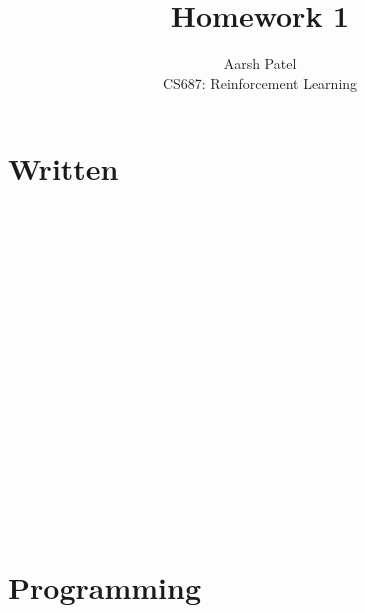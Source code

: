 \documentclass[12pt]{article}
\newenvironment{problem}[2][Problem]{\begin{trivlist}
\item[\hskip \labelsep {\bfseries #1}\hskip \labelsep {\bfseries #2.}]}{\end{trivlist}}
\begin{document}
\title{Homework 1}
\author{Aarsh Patel\\
CS687: Reinforcement Learning}

\maketitle

\section{Written}

\begin{problem}{1}
\text{ }\\
\end{problem}

\begin{problem}{2}
\text{ }\\
\end{problem}

\begin{problem}{3}
\text{ }\\
\end{problem}

\begin{problem}{4}
\text{ }\\
\end{problem}

\begin{problem}{5}
\text{ }\\
\end{problem}

\begin{problem}{6}
\text{ }\\
\end{problem}

\begin{problem}{7}
\text{ }\\
\end{problem}

\begin{problem}{8}
\text{ }\\
\end{problem}

\begin{problem}{9}
\text{ }\\
\end{problem}

\begin{problem}{10}
\text{ }\\
\end{problem}

\section{Programming}

\begin{problem}{1}
\text{ }\\
\end{problem}
\end{document}
